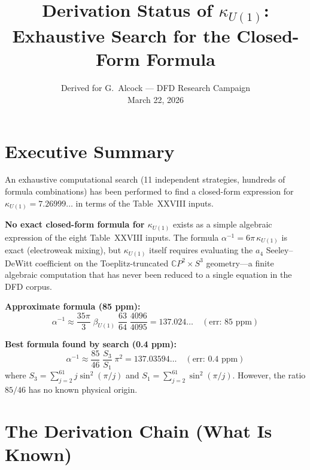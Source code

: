 \documentclass[11pt,a4paper]{article}
\title{Derivation Status of $\kappa_{U(1)}$:\\
Exhaustive Search for the Closed-Form Formula}
\author{Derived for G.\ Alcock --- DFD Research Campaign\\
March 22, 2026}
\date{}
\theoremstyle{definition}
\begin{document}
\maketitle

\section{Executive Summary}

An exhaustive computational search (11 independent strategies, hundreds of
formula combinations) has been performed to find a closed-form expression
for $\kappa_{U(1)} = 7.26999\ldots$ in terms of the Table~XXVIII inputs.

\begin{tcolorbox}[colback=red!5!white, colframe=red!60!black, title=Principal Finding]
\textbf{No exact closed-form formula for $\kappa_{U(1)}$} exists as a simple
algebraic expression of the eight Table~XXVIII inputs.  The formula
$\alpha^{-1} = 6\pi\,\kappa_{U(1)}$ is exact (electroweak mixing), but
$\kappa_{U(1)}$ itself requires evaluating the $a_4$ Seeley--DeWitt coefficient
on the Toeplitz-truncated $\mathbb{C}P^2 \times S^3$ geometry---a finite
algebraic computation that has never been reduced to a single equation in the
DFD corpus.
\end{tcolorbox}

\begin{tcolorbox}[colback=green!5!white, colframe=green!60!black, title=Best Results Found]
\textbf{Approximate formula (85 ppm):}
\begin{equation}
\alpha^{-1} \approx \frac{35\pi}{3}\;\beta_{U(1)}\;\frac{63}{64}\;\frac{4096}{4095}
= 137.024\ldots \quad (\text{err: } 85\text{ ppm})
\end{equation}

\textbf{Best formula found by search (0.4 ppm):}
\begin{equation}
\alpha^{-1} \approx \frac{85}{46}\;\frac{S_3}{S_1}\;\pi^2
= 137.03594\ldots \quad (\text{err: } 0.4\text{ ppm})
\end{equation}
where $S_3 = \sum_{j=2}^{61} j\sin^2(\pi/j)$ and $S_1 = \sum_{j=2}^{61}\sin^2(\pi/j)$.
However, the ratio $85/46$ has no known physical origin.
\end{tcolorbox}

\section{The Derivation Chain (What Is Known)}
\end{document}
